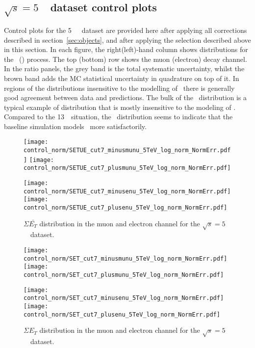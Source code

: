 \subsection{$\sqrt{s} = 5$~\TeV\ dataset control plots}
\label{subsec:controlplots5}
Control plots for the 5~\TeV\ \lowmu\ dataset are provided here after applying all corrections described in section~\ref{sec:objects}, and after applying the selection described above in this section. In each figure, the right(left)-hand column shows distributions for the \Wplus\ (\Wminus) process. The top (bottom) row shows the muon (electron) decay channel. In the ratio panels, the grey band is the total systematic uncertainty, whilst the brown band adds the MC statistical uncertainty in quadrature on top of it. In regions of the distributions insensitive to the modelling of \ptw\ there is generally good agreement between data and predictions. The bulk of the \mt\ distribution is a typical example of distribution that is mostly insensitive to the modeling of \ptw. Compared to the 13~\TeV\ situation, the \ut\ distribution seems to indicate that the baseline simulation models \ptw\ more satisfactorily.

\begin{figure}[h]
	\centering
	{\texttt{[image: control\_norm/SETUE\_cut7\_minusmunu\_5TeV\_log\_norm\_NormErr.pdf]}\label{f:SETUEmm5}}
	{\texttt{[image: control\_norm/SETUE\_cut7\_plusmunu\_5TeV\_log\_norm\_NormErr.pdf]}\label{f:SETUEpm5}}
	
	{\texttt{[image: control\_norm/SETUE\_cut7\_minusenu\_5TeV\_log\_norm\_NormErr.pdf]}\label{f:}}
	{\texttt{[image: control\_norm/SETUE\_cut7\_plusenu\_5TeV\_log\_norm\_NormErr.pdf]}\label{f:}}
	\caption{$\Sigma \bar{E_T}$ distribution in the muon and electron channel  for the $\sqrt{s} = 5$~\TeV\ dataset.}
\end{figure}
%

\begin{figure}[h]
	\centering
	{\texttt{[image: control\_norm/SET\_cut7\_minusmunu\_5TeV\_log\_norm\_NormErr.pdf]}\label{f:set5}}
	{\texttt{[image: control\_norm/SET\_cut7\_plusmunu\_5TeV\_log\_norm\_NormErr.pdf]}\label{f:setpl}}
	
	{\texttt{[image: control\_norm/SET\_cut7\_minusenu\_5TeV\_log\_norm\_NormErr.pdf]}\label{f:}}
	{\texttt{[image: control\_norm/SET\_cut7\_plusenu\_5TeV\_log\_norm\_NormErr.pdf]}\label{f:}}
	\caption{$\Sigma{E_T}$ distribution in the muon and electron channel  for the $\sqrt{s} = 5$~\TeV\ dataset.}
\end{figure}
\newpage


